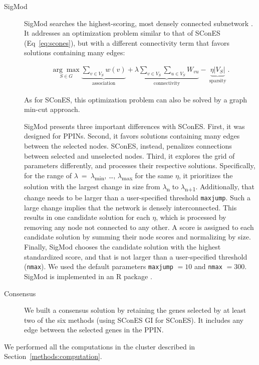 \documentclass[10pt,letterpaper]{article}
\begin{document}
\begin{description}
\item[{SigMod}] SigMod searches the highest-scoring, most densely connected subnetwork \cite{liu_sigmod:_2017}. It addresses an optimization problem similar to that of SConES (Eq~\ref{eq:scones}), but with a different connectivity term that favors solutions containing many edges:  

\begin{eqnarray}
\underset{S \in G}{\arg \max } \underbrace{\sum_{v \in V_S} w(v)}_{\text { association }} + \underbrace{\lambda \sum_{v \in V_S} \sum_{u \in V_S} W_{vu} }_{\text { connectivity }} -\underbrace{\eta \lvert V_S \rvert }_{\text { sparsity }}.
\end{eqnarray}

As for SConES, this optimization problem can also be solved by a graph min-cut approach. 

SigMod presents three important differences with SConES. First, it was designed for PPINs. Second, it favors solutions containing many edges between the selected nodes. SConES, instead, penalizes connections between selected and unselected nodes. Third, it explores the grid of parameters differently, and processes their respective solutions. Specifically, for the range of \(\lambda\)~=~\(\lambda\)\textsubscript{min}, \dots{}, \(\lambda\)\textsubscript{max} for the same \(\eta\), it prioritizes the solution with the largest change in size from \(\lambda\)\textsubscript{n} to \(\lambda\)\textsubscript{n+1}. Additionally, that change needs to be larger than a user-specified threshold \texttt{maxjump}. Such a large change implies that the network is densely interconnected. This results in one candidate solution for each \(\eta\), which is processed by removing any node not connected to any other. A score is assigned to each candidate solution by summing their node scores and normalizing by size. Finally, SigMod chooses the candidate solution with the highest standardized score, and that is not larger than a user-specified threshold (\texttt{nmax}). We used the default parameters \texttt{maxjump} $ = 10$ and \texttt{nmax} $= 300$. SigMod is implemented in an R package \cite{sigmod}.

\item[{Consensus}] We built a consensus solution by retaining the genes selected by at least two of the six methods (using SConES GI for SConES). It includes any edge between the selected genes in the PPIN.
\end{description}

We performed all the computations in the cluster described in Section~\ref{methods:computation}. 
\end{document}
